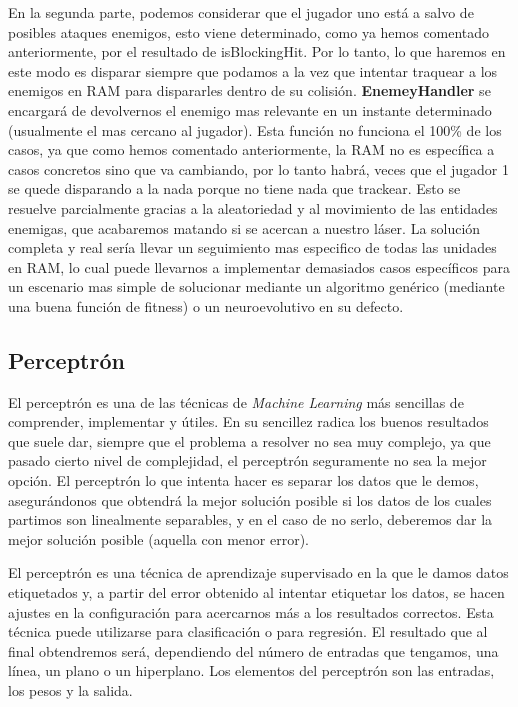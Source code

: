 En la segunda parte, podemos considerar que el jugador uno está a salvo de posibles ataques enemigos, esto viene determinado, como ya hemos comentado anteriormente, por el resultado de isBlockingHit. Por lo tanto, lo que haremos en este modo es disparar siempre que podamos a la vez que intentar traquear a los enemigos en RAM para dispararles dentro de su colisión. \textbf{EnemeyHandler} se encargará de devolvernos el enemigo mas relevante en un instante determinado (usualmente el mas cercano al jugador). Esta función no funciona el 100\% de los casos, ya que como hemos comentado anteriormente, la RAM no es específica a casos concretos sino que va cambiando, por lo tanto habrá, veces que el jugador 1 se quede disparando a la nada porque no tiene nada que trackear. Esto se resuelve parcialmente gracias a la aleatoriedad y al movimiento de las entidades enemigas, que acabaremos matando si se acercan a nuestro láser. La solución completa y real sería llevar un seguimiento mas especifico de todas las unidades en RAM, lo cual puede llevarnos a implementar demasiados casos específicos para un escenario mas simple de solucionar mediante un algoritmo genérico (mediante una buena función de fitness) o un neuroevolutivo en su defecto.


\newpage
\subsection{Perceptrón}
\label{subsec:perceptron}

El perceptrón es una de las técnicas de \textit{Machine Learning} más sencillas de comprender, implementar y útiles. En su sencillez radica los buenos resultados que suele dar, siempre que el problema a resolver no sea muy complejo, ya que pasado cierto nivel de complejidad, el perceptrón seguramente no sea la mejor opción. El perceptrón lo que intenta hacer es separar los datos que le demos, asegurándonos que obtendrá la mejor solución posible si los datos de los cuales partimos son linealmente separables, y en el caso de no serlo, deberemos dar la mejor solución posible (aquella con menor error).

El perceptrón es una técnica de aprendizaje supervisado en la que le damos datos etiquetados y, a partir del error obtenido al intentar etiquetar los datos, se hacen ajustes en la configuración para acercarnos más a los resultados correctos. Esta técnica puede utilizarse para clasificación o para regresión. El resultado que al final obtendremos será, dependiendo del número de entradas que tengamos, una línea, un plano o un hiperplano. Los elementos del perceptrón son las entradas, los pesos y la salida.

